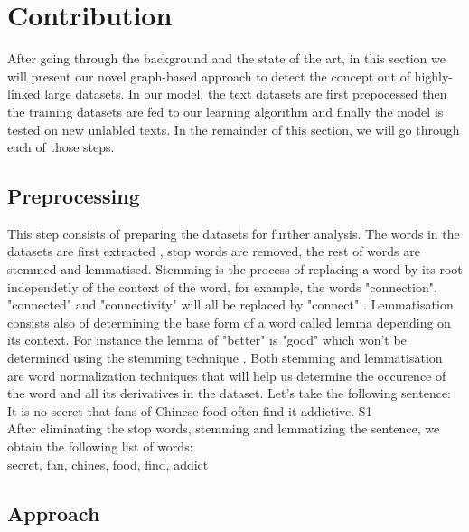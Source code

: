 \chapter{Contribution}
After going through the background and the state of the art, in this section we will present our novel graph-based approach to detect the concept out of highly-linked large datasets.
In our model, the text datasets are first prepocessed then the training datasets are fed to our learning algorithm and finally the model is tested on new unlabled texts. In the remainder of this section, we will go through each of those steps.

\section{Preprocessing}
This step consists of preparing the datasets for further analysis. The words in the datasets are first extracted , stop words are removed, the rest of words are stemmed and lemmatised. Stemming is the process of replacing a word by its root independetly of the context of the word, for example, the words "connection", "connected" and "connectivity" will all be replaced by "connect" \cite{a:stem}. Lemmatisation consists also of determining the base form of a word called lemma depending on its context. For instance the lemma of "better" is "good" which won't be determined using the stemming technique \cite{a:lemma}.
Both stemming and lemmatisation are word normalization techniques that will help us determine the occurence of the word and all its derivatives in the dataset.
Let's take the following sentence: \\
	It is no secret that fans of Chinese food often find it addictive. S1\\
After eliminating the stop words, stemming and lemmatizing the sentence, we obtain the following list of words: \\
secret, fan, chines, food, find, addict



\section{Approach}
